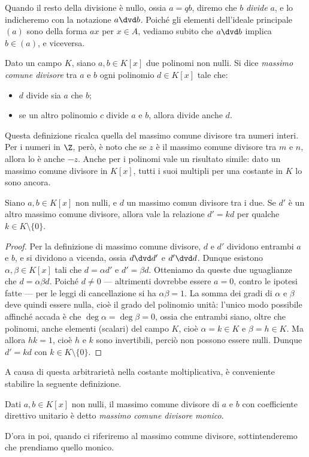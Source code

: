 Quando il resto della divisione è nullo, ossia $a=qb$, diremo che $b$ \emph{divide} $a$, e lo indicheremo con la notazione $a\dvd b$.
Poich\'e gli elementi dell'ideale principale $(a)$ sono della forma $ax$ per $x\in A$, vediamo subito che $a\dvd b$ implica $b\in(a)$, e viceversa.
\begin{definizione} \label{d:mcd}
	Dato un campo $K$, siano $a,b\in K[x]$ due polinomi non nulli.
	Si dice \emph{massimo comune divisore} tra $a$ e $b$ ogni polinomio $d\in K[x]$ tale che:
	\begin{itemize}
		\item $d$ divide sia $a$ che $b$;
		\item se un altro polinomio $c$ divide $a$ e $b$, allora divide anche $d$.
	\end{itemize}
\end{definizione}
Questa definizione ricalca quella del massimo comune divisore tra numeri interi.
Per i numeri in $\Z$, però, è noto che se $z$ è il massimo comune divisore tra $m$ e $n$, allora lo è anche $-z$.
Anche per i polinomi vale un risultato simile: dato un massimo comune divisore in $K[x]$, tutti i suoi multipli per una costante in $K$ lo sono ancora.
\begin{teorema} \label{t:altri-mcd}
	Siano $a,b\in K[x]$ non nulli, e $d$ un massimo comun divisore tra i due.
	Se $d'$ è un altro massimo comune divisore, allora vale la relazione $d'=kd$ per qualche $k\in K\setminus\{0\}$.
\end{teorema}
\begin{proof}
	Per la definizione di massimo comune divisore, $d$ e $d'$ dividono entrambi $a$ e $b$, e si dividono a vicenda, ossia $d\dvd d'$ e $d'\dvd d$.
	Dunque esistono $\alpha,\beta\in K[x]$ tali che $d=\alpha d'$ e $d'=\beta d$.
	Otteniamo da queste due uguaglianze che $d=\alpha\beta d$.
	Poich\'e $d\neq 0$ --- altrimenti dovrebbe essere $a=0$, contro le ipotesi fatte --- per le leggi di cancellazione si ha $\alpha\beta=1$.
	La somma dei gradi di $\alpha$ e $\beta$ deve quindi essere nulla, cioè il grado del polinomio unità: l'unico modo possibile affinché accada è che $\deg\alpha=\deg\beta=0$, ossia che entrambi siano, oltre che polinomi, anche elementi (scalari) del campo $K$, cioè $\alpha=k\in K$ e $\beta=h\in K$.
	Ma allora $hk=1$, cioè $h$ e $k$ sono invertibili, perciò non possono essere nulli.
	Dunque $d'=kd$ con $k\in K\setminus\{0\}$.
\end{proof}
A causa di questa arbitrarietà nella costante moltiplicativa, è conveniente stabilire la seguente definizione.
\begin{definizione}\label{d:mcd-monico}
	Dati $a,b\in K[x]$ non nulli, il massimo comune divisore di $a$ e $b$ con coefficiente direttivo unitario è detto \emph{massimo comune divisore monico}.
\end{definizione}
D'ora in poi, quando ci riferiremo al massimo comune divisore, sottintenderemo che prendiamo quello monico.

